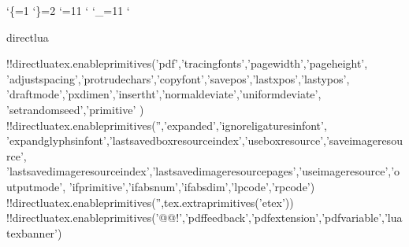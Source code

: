 
\catcode`\{=1
\catcode`\}=2
\catcode`\@=11
\catcode`
\catcode`\_=11
\catcode`

\let\@@!directlua\directlua \let\directlua\undefined

\@@!directlua{tex.enableprimitives('pdf',{'tracingfonts','pagewidth','pageheight',
'adjustspacing','protrudechars','copyfont','savepos','lastxpos','lastypos',
'draftmode','pxdimen','insertht','normaldeviate','uniformdeviate', 'setrandomseed','primitive'
})}
\@@!directlua{tex.enableprimitives('',{'expanded','ignoreligaturesinfont',
'expandglyphsinfont','lastsavedboxresourceindex','useboxresource','saveimageresource',
'lastsavedimageresourceindex','lastsavedimageresourcepages','useimageresource','outputmode',
'ifprimitive','ifabsnum','ifabsdim','lpcode','rpcode'})}
\@@!directlua{tex.enableprimitives('',tex.extraprimitives('etex'))}
\@@!directlua{tex.enableprimitives('@@!',{'pdffeedback','pdfextension','pdfvariable','luatexbanner'})}



\let\pdfnoligatures     \ignoreligaturesinfont       \let\ignoreligaturesinfont\undefined
\let\pdffontexpand      \expandglyphsinfont          \let\expandglyphsinfont\undefined
\let\pdfxform           \saveboxresource             \let\saveboxresource\undefined
\let\pdflastxform       \lastsavedboxresourceindex   \let\lastsavedboxresourceindex\undefined
\let\pdfrefxform        \useboxresource              \let\useboxresource\undefined
\let\pdfximage          \saveimageresource           \let\saveimageresource\undefined
\let\pdflastximage      \lastsavedimageresourceindex \let\lastsavedimageresourceindex\undefined
\let\pdflastximagepages \lastsavedimageresourcepages \let\lastsavedimageresourcepages\undefined
\let\pdfrefximage       \useimageresource            \let\useimageresource\undefined

\let\pdfoutput          \outputmode                  \let\outputmode\undefined

